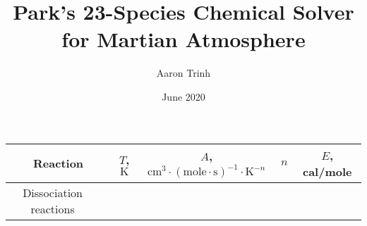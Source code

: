 \documentclass{warpdoc}
\author{
  Aaron Trinh 
}
\title{Park's 23-Species Chemical Solver for Martian Atmosphere
}
\date{
  June 2020
}
\renewcommand{\fontsizetable}{\footnotesize\scalefont{0.9}}
\begin{document}
  \pagestyle{headings}
  \setcounter{page}{1}
  \makewarpdoctitle

\begin{table}[!h]
\fontsizetable
\begin{center}
\begin{threeparttable}
\begin{tabular}{cccccc} 
\toprule
\multicolumn{2}{c}{Reaction} & $T$, $\textrm{K}$ & $A$, $\textrm{cm}^3\cdot(\textrm{mole}\cdot \textrm{s})^{-1}\cdot \textrm{K}^{-n}$ & $n$ & $E$, cal/mole \\ 
\midrule

Dissociation reactions \\


\end{tabular}
\end{threeparttable}
\end{center}
\end{table}
\end{document}
